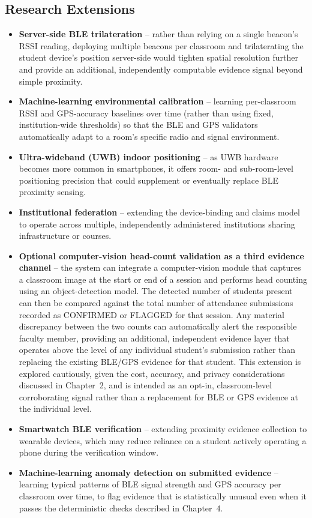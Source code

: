 \documentclass[12pt, a4paper, oneside]{report}
\begin{document}
\subsection{Research Extensions}
\begin{itemize}
    \item \textbf{Server-side BLE trilateration} -- rather than relying on a single beacon's RSSI reading, deploying multiple beacons per classroom and trilaterating the student device's position server-side would tighten spatial resolution further and provide an additional, independently computable evidence signal beyond simple proximity.
    \item \textbf{Machine-learning environmental calibration} -- learning per-classroom RSSI and GPS-accuracy baselines over time (rather than using fixed, institution-wide thresholds) so that the BLE and GPS validators automatically adapt to a room's specific radio and signal environment.
    \item \textbf{Ultra-wideband (UWB) indoor positioning} -- as UWB hardware becomes more common in smartphones, it offers room- and sub-room-level positioning precision that could supplement or eventually replace BLE proximity sensing.
    \item \textbf{Institutional federation} -- extending the device-binding and claims model to operate across multiple, independently administered institutions sharing infrastructure or courses.
    \item \textbf{Optional computer-vision head-count validation as a third evidence channel} -- the system can integrate a computer-vision module that captures a classroom image at the start or end of a session and performs head counting using an object-detection model. The detected number of students present can then be compared against the total number of attendance submissions recorded as CONFIRMED or FLAGGED for that session. Any material discrepancy between the two counts can automatically alert the responsible faculty member, providing an additional, independent evidence layer that operates above the level of any individual student's submission rather than replacing the existing BLE/GPS evidence for that student. This extension is explored cautiously, given the cost, accuracy, and privacy considerations discussed in Chapter~2, and is intended as an opt-in, classroom-level corroborating signal rather than a replacement for BLE or GPS evidence at the individual level.
    \item \textbf{Smartwatch BLE verification} -- extending proximity evidence collection to wearable devices, which may reduce reliance on a student actively operating a phone during the verification window.
    \item \textbf{Machine-learning anomaly detection on submitted evidence} -- learning typical patterns of BLE signal strength and GPS accuracy per classroom over time, to flag evidence that is statistically unusual even when it passes the deterministic checks described in Chapter~4.
\end{itemize}
\end{document}
